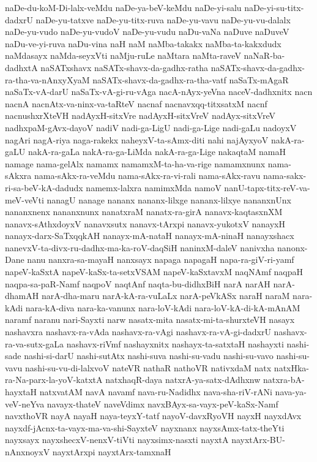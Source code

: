 {naDe-du-koM-Di-lalx-veMdu
naDe-ya-beV-keMdu
naDe-yi-salu
naDe-yi-su-titx-dadxrU
naDe-yu-tatxve
naDe-yu-titx-ruva
naDe-yu-vavu
naDe-yu-vu-dalalx
naDe-yu-vudo
naDe-yu-vudoV
naDe-yu-vudu
naDu-vaNa
naDuve
naDuveV
naDu-ve-yi-ruva
naDu-vina
naH
naM
naMba-takakx
naMba-ta-kakxdudx
naMdasayx
naMda-seyxVti
naMju-ruLe
naMtara
naMta-raveV
naNaR-ba-dadhxtA
naSATxshavx
naSATx-shavx-da-gadhx-ratha
naSATx-shavx-da-gadhx-ra-tha-va-nAnxyXyaM
naSATx-shavx-da-gadhx-ra-tha-vatf
naSaTx-mAgaR
naSaTx-vA-darU
naSaTx-vA-gi-ru-vAga
nacA-nAyx-yeVna
naceV-dadhxnitx
nacn
nacnA
nacnAtx-va-ninx-va-taRteV
nacnaf
nacnavxqq-titxsatxM
nacnf
nacnushxrXteVH
nadAyxH-sitxVre
nadAyxH-sitxVreV
nadAyx-sitxVreV
nadhxpaM-gAvx-dayoV
nadiV
nadi-ga-LigU
nadi-ga-Lige
nadi-gaLu
nadoyxV
nagAri
nagA-riya
naga-rakekx
naheyxV-ta-sAmx-diti
nahi
najAyxyoV
nakA-ra-gaLU
nakA-ra-gaLa
nakA-ra-ga-LiMda
nakA-ra-ga-Lige
nakaqtaM
namaH
namage
nama-gelAlx
namamx
namamxM-ta-ha-va-rige
namamxnunx
nama-sAkxra
nama-sAkx-ra-veMdu
nama-sAkx-ra-vi-rali
nama-sAkx-ravu
nama-sakx-ri-sa-beV-kA-dadudx
namemx-lalxra
namimxMda
namoV
nanU-tapx-titx-reV-va-meV-veVti
nanagU
nanage
nananx
nananx-lilxge
nananx-lilxye
nananxnUnx
nananxnenx
nananxnunx
nanatxraM
nanatx-ra-girA
nanavx-kaqtasxnXM
nanavx-sAthxdoyxV
nanavxsutx
nanavx-tArxpi
nanavx-yukotxV
nanayxH
nanayx-darx-SaTxqqkAH
nanayx-mA-nataH
nanayx-mA-ninaH
nanayxshacx
nanevxV-ta-divx-ru-dadhx-ma-ka-roV-daqSiH
naninxM-daleV
nanivxha
nanonx-Dane
nanu
nanxra-sa-mayaH
nanxsayx
napaga
napagaH
napa-ra-giV-ri-yamf
napeV-kaSxtA
napeV-kaSx-ta-setxVSAM
napeV-kaSxtavxM
naqNAmf
naqpaH
naqpa-sa-paR-Namf
naqpoV
naqtAnf
naqta-bu-didhxBiH
narA
narAH
narA-dhamAH
narA-dha-maru
narA-kA-ra-vuLaLx
narA-peVkASx
naraH
naraM
nara-kAdi
nara-kA-diva
nara-ka-vanunx
nara-loV-kAdi
nara-loV-kA-di-kA-mAnAM
naramf
naranu
nari-Sayxti
narw
nasatx-mita
nasatx-mi-ta-shurxteVH
nasayx
nashavxra
nashavx-ra-vAda
nashavx-ra-vAgi
nashavx-ra-vA-gi-dadxrU
nashavx-ra-va-sutx-gaLa
nashavx-riVmf
nashayxnitx
nashayx-ta-satxtaH
nashayxti
nashi-sade
nashi-si-darU
nashi-sutAtx
nashi-suva
nashi-su-vadu
nashi-su-vavo
nashi-su-vavu
nashi-su-vu-di-lalxvoV
nateVR
nathaR
nathoVR
nativxdaM
natx
natxHka-ra-Na-parx-la-yoV-katxtA
natxhaqR-daya
natxrA-ya-satx-dAdhxnw
natxra-bA-hayxtaH
natxvatAM
navA
navamf
nava-ru-Nadidhx
nava-sha-riV-rANi
nava-ya-veV-neYva
navayx-thateV
naveVdimx
navxBAyx-sa-vayx-peV-kaSx-Namf
navxthoVR
nayA
nayaH
naya-teyxY-tatf
nayoV-davxRyoVH
nayxH
nayxdAvx
nayxdf-jAcnx-ta-vayx-ma-va-shi-SayxteV
nayxnanx
nayxsAmx-tatx-theYti
nayxsayx
nayxshecxV-nenxV-tiVti
nayxsimx-nasxti
nayxtA
nayxtArx-BU-nAnxnoyxV
nayxtArxpi
nayxtArx-tamxnaH
}
